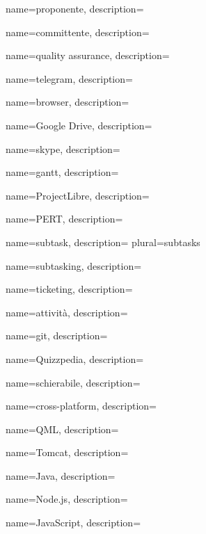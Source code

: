  {
	name=proponente,
	description={\TODO{}}
}

 {
	name=committente,
	description={\TODO{}}
}

 {
	name=quality assurance,
	description={\TODO{}}
}

 {
	name=telegram,
	description={\TODO{}}
}

 {
	name=browser,
	description={\TODO{}}
}

 {
	name=Google Drive,
	description={\TODO{}}
}

 {
	name=skype,
	description={\TODO{}}
}

 {
	name=gantt,
	description={\TODO{}}
}

 {
	name=ProjectLibre,
	description={\TODO{}}
}

 {
	name=PERT,
	description={\TODO{}}
}

 {
	name=subtask,
	description={\TODO{}}
	plural=subtasks
}

 {
	name=subtasking,
	description={\TODO{}}
}

 {
	name=ticketing,
	description={\TODO{}}
}

 {
	name=attività,
	description={\TODO{}}
}

 {
	name=git,
	description={\TODO{}}
}

 {
	name=Quizzpedia,
	description={\TODO{}}
}

 {
	name=schierabile,
	description={\TODO{}}
}

 {
	name=cross-platform,
	description={\TODO{}}
}

 {
	name=QML,
	description={\TODO{}}
}

 {
	name=Tomcat,
	description={\TODO{}}
}

 {
	name=Java,
	description={\TODO{}}
}

 {
	name=Node.js,
	description={\TODO{}}
}

 {
	name=JavaScript,
	description={\TODO{}}
}

